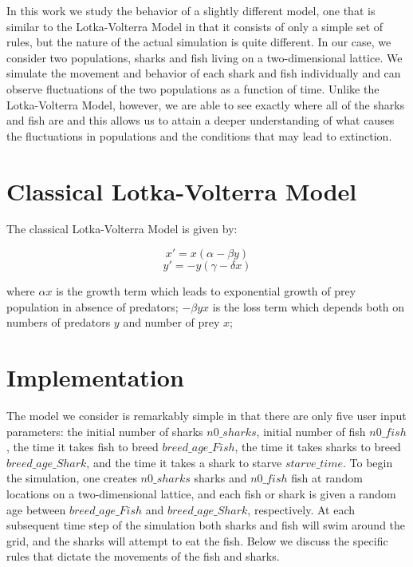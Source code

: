 \documentclass[aps,prl,preprint,superscriptaddress]{revtex4}
\begin{document}
In this work we study the behavior of a slightly different model, one that  is similar to the Lotka-Volterra Model in that it consists of only a simple set of rules, but the nature of the actual simulation is quite different. In our case, we consider two populations, sharks and fish living on a two-dimensional lattice. We simulate the movement and behavior of each shark and fish individually and can observe fluctuations of the two populations as a function of time. Unlike the Lotka-Volterra Model, however, we are able to see exactly where all of the sharks and fish are and this allows us to attain a deeper understanding of what causes the fluctuations in populations and the conditions that may lead to extinction. 
\section{Classical Lotka-Volterra Model}	
The classical Lotka-Volterra Model is given by:


\begin{equation}
x' = x(\alpha-\beta y)
\end{equation}
\begin{equation}
y' = -y(\gamma -\delta x)
\end{equation}

where $\alpha x$ is the growth term which leads to exponential growth of prey population in absence of predators; $-\beta yx$ is the loss term which depends both on numbers of predators $y$ and number of prey $x$; 

\section{Implementation}

The model we consider is remarkably simple in that there are only five user input parameters: the initial number of sharks $n0\_sharks$, initial number of fish $n0\_fish$, the time it takes fish to breed $breed\_age\_Fish$, the time it takes sharks to breed $breed\_age\_Shark$, and the time it takes a shark to starve $starve\_time$. To begin the simulation, one creates $n0\_sharks$ sharks and $n0\_fish$ fish at random locations on a two-dimensional lattice, and each fish or shark is given a random age between $breed\_age\_Fish$ and $breed\_age\_Shark$, respectively. At each subsequent time step of the simulation both sharks and fish will swim around the grid, and the sharks will attempt to eat the fish. Below we discuss the specific rules that dictate the movements of the fish and sharks.
\end{document}
